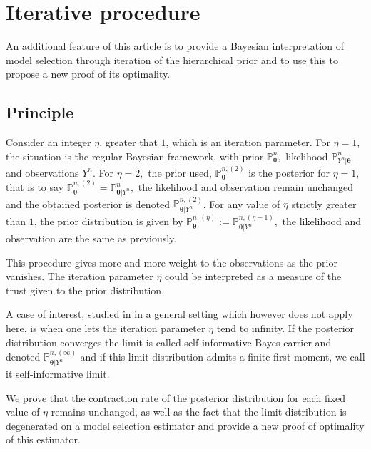 \section{Iterative procedure}\label{4}
An additional feature of this article is to provide a Bayesian interpretation of model selection through iteration of the hierarchical prior and to use this to propose a new proof of its optimality.

\subsection{Principle}

Consider an integer $\eta$, greater that $1$, which is an iteration parameter.
For $\eta = 1,$ the situation is the regular Bayesian framework, with prior $\mathds{P}_{\boldsymbol{\theta}}^{n},$ likelihood $\mathds{P}_{Y^{n} \vert \boldsymbol{\theta}}^{n}$ and observations $Y^{n}$.
For $\eta = 2,$ the prior used, $\mathds{P}_{\boldsymbol{\theta}}^{n, (2)}$ is the posterior for $\eta = 1$, that is to say $\mathds{P}_{\boldsymbol{\theta}}^{n, (2)} = \mathds{P}_{\boldsymbol{\theta}\vert Y^{n}}^{n},$ the likelihood and observation remain unchanged and the obtained posterior is denoted  $\mathds{P}_{\boldsymbol{\theta}\vert Y^{n}}^{n, (2)}$.
For any value of $\eta$ strictly greater than $1$, the prior distribution is given by $\mathds{P}_{\boldsymbol{\theta}}^{n, (\eta)} := \mathds{P}_{\boldsymbol{\theta}\vert Y^{n}}^{n, (\eta-1)},$ the likelihood and observation are the same as previously.

This procedure gives more and more weight to the observations as the prior vanishes. The iteration parameter $\eta$ could be interpreted as a measure of the trust given to the prior distribution.

A case of interest, studied in \textsc{\citet{OBJJ}} in a general setting which however does not apply here, is when one lets the iteration parameter $\eta$ tend to infinity.
If the posterior distribution converges the limit is called self-informative Bayes carrier and denoted $\mathds{P}_{\boldsymbol{\theta}\vert Y^{n}}^{n, (\infty)}$ and if this limit distribution admits a finite first moment, we call it self-informative limit.

\bigskip

We prove that the contraction rate of the posterior distribution for each fixed value of $\eta$ remains unchanged, as well as the fact that the limit distribution is degenerated on a model selection estimator and provide a new proof of optimality of this estimator.

